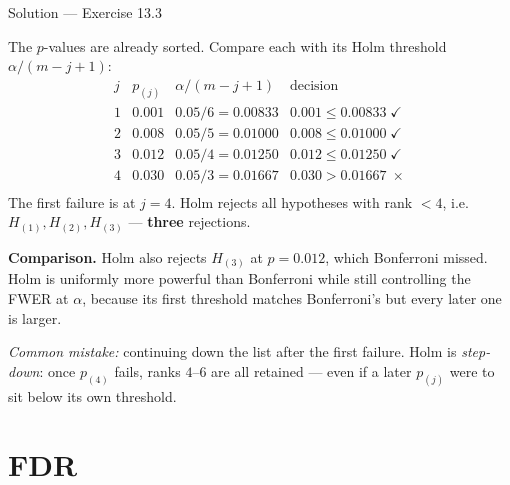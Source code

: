 \documentclass[aspectratio=169,11pt]{beamer}
\begin{document}
\begin{frame}{Solution --- Exercise 13.3}
\begin{solutionbox}
  The $p$-values are already sorted. Compare each with its Holm
  threshold $\alpha / (m - j + 1)$:
  \[
    \begin{array}{c|c|c|c}
      j & p_{(j)} & \alpha/(m-j+1) & \text{decision} \\ \hline
      1 & 0.001 & 0.05/6 = 0.00833 & 0.001 \le 0.00833 \;\checkmark \\
      2 & 0.008 & 0.05/5 = 0.01000 & 0.008 \le 0.01000 \;\checkmark \\
      3 & 0.012 & 0.05/4 = 0.01250 & 0.012 \le 0.01250 \;\checkmark \\
      4 & 0.030 & 0.05/3 = 0.01667 & 0.030 > 0.01667 \;\times \\
    \end{array}
  \]
  The first failure is at $j = 4$. Holm rejects all hypotheses with
  rank $< 4$, i.e. $H_{(1)}, H_{(2)}, H_{(3)}$ --- \textbf{three}
  rejections.

  \medskip
  \textbf{Comparison.} Holm also rejects $H_{(3)}$ at $p = 0.012$,
  which Bonferroni missed. Holm is uniformly more powerful than
  Bonferroni while still controlling the FWER at $\alpha$, because its
  first threshold matches Bonferroni's but every later one is larger.

  \medskip
  \textit{Common mistake:} continuing down the list after the first
  failure. Holm is \emph{step-down}: once $p_{(4)}$ fails, ranks $4$--$6$
  are all retained --- even if a later $p_{(j)}$ were to sit below its own
  threshold.
\end{solutionbox}
\end{frame}

\section{FDR}
\end{document}
